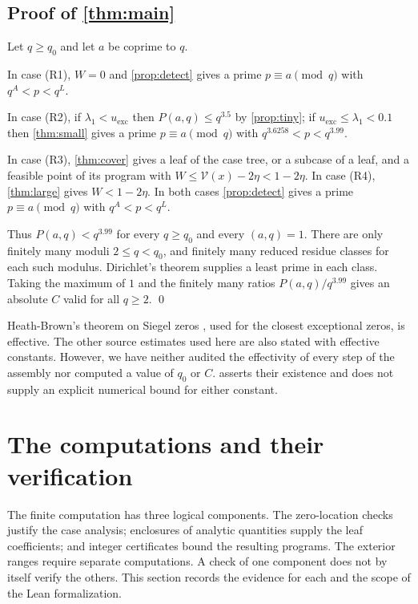 \documentclass[11pt]{amsart}
\numberwithin{equation}{section}
\theoremstyle{plain}
\theoremstyle{definition}
\theoremstyle{remark}
\newcommand{\1}{\mathbf{1}}
\begin{document}
\subsection{Proof of \texorpdfstring{\cref{thm:main}}{the main theorem}}
Let $q\ge q_0$ and let $a$ be coprime to $q$.

In case (R1), $W=0$ and \cref{prop:detect} gives a prime $p\equiv a\pmod q$ with $q^A<p<q^L$.

In case (R2), if $\lambda_1<u_{\mathrm{exc}}$ then $P(a,q)\le q^{3.5}$ by \cref{prop:tiny}; if $u_{\mathrm{exc}}\le\lambda_1<0.1$ then
\cref{thm:small} gives a prime $p\equiv a\pmod q$ with $q^{3.6258}<p<q^{3.99}$.

In case (R3), \cref{thm:cover} gives a leaf of the case tree, or a subcase of a leaf, and a
feasible point of its program with $W\le\mathcal V(x)-2\eta<1-2\eta$. In case (R4), \cref{thm:large}
gives $W<1-2\eta$. In both cases \cref{prop:detect} gives a prime $p\equiv a\pmod q$ with
$q^A<p<q^L$.

Thus $P(a,q)<q^{3.99}$ for every $q\ge q_0$ and every $(a,q)=1$.
There are only finitely many moduli $2\le q<q_0$, and finitely many reduced residue
classes for each such modulus. Dirichlet's theorem supplies a least prime in each
class. Taking the maximum of $1$ and the finitely many ratios $P(a,q)/q^{3.99}$ gives
an absolute $C$ valid for all $q\ge2$. \qed

\begin{remark}[Effectivity]
Heath-Brown's theorem on Siegel zeros \cite[Corollary~1]{HeathBrown1990siegel}, used for
the closest exceptional zeros, is effective. The other source estimates used here are
also stated with effective constants. However, we have neither audited the effectivity
of every step of the assembly nor computed a value of $q_0$ or $C$.
 asserts their existence and does not supply an explicit numerical bound
for either constant.
\end{remark}

\section{The computations and their verification}\label{sec:verification}

The finite computation has three logical components. The zero-location checks justify
the case analysis; enclosures of analytic quantities supply the leaf coefficients;
and integer certificates bound the resulting programs. The exterior ranges require
separate computations. A check of one component does not by itself verify the others.
This section records the evidence for each and the scope of the Lean formalization.
\end{document}
